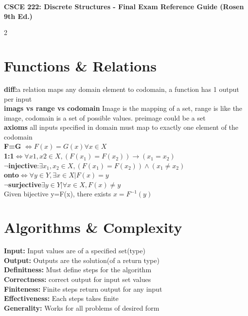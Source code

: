 \documentclass[10pt]{article}
\begin{document}
\scriptsize

\begin{center}
    \textbf{CSCE 222: Discrete Structures - Final Exam Reference Guide (Rosen 9th Ed.)}
\end{center}

\begin{multicols*}{2}

\section{Functions \& Relations}
\textbf{diff:}a relation maps any domain element to codomain, a function has 1 output per input\\
\textbf{imags vs range vs codomain} Image is the mapping of a set, range is like the image, codomain is a set of possible values. preimage could be a set\\
\textbf{axioms} all inputs specified in domain must map to exactly one element of the codomain\\
\textbf{F=G} $\iff F(x) = G(x) \forall x \in X$\\
\textbf{1:1}$\iff \forall x1, x2 \in X, (F(x_1) = F(x_2))\to (x_1 = x_2)$\\
\textbf{$\lnot$injective}:$\exists x_1,x_2 \in X, (F(x_1)=F(x_2))\land(x_1\neq x_2)$\\
\textbf{onto}$\iff \forall y \in Y, \exists x \in X | F(x)=y$\\
\textbf{$\lnot$surjective}$\exists y \in Y | \forall x \in X, F(x)\neq y$\\
Given bijective y=F(x), there exists $x=F^{-1}(y)$
\section{Algorithms \& Complexity}
\textbf{Input:} Input values are of a specified set(type)\\
\textbf{Output:} Outputs are the solution(of a return type)\\
\textbf{Definitness:} Must define steps for the algorithm\\
\textbf{Correctness:} correct output for input set values\\
\textbf{Finiteness:} Finite steps return output for any input\\
\textbf{Effectiveness:} Each steps takes finite \\
\textbf{Generality:} Works for all problems of desired form\\




\end{multicols*}
\end{document}
